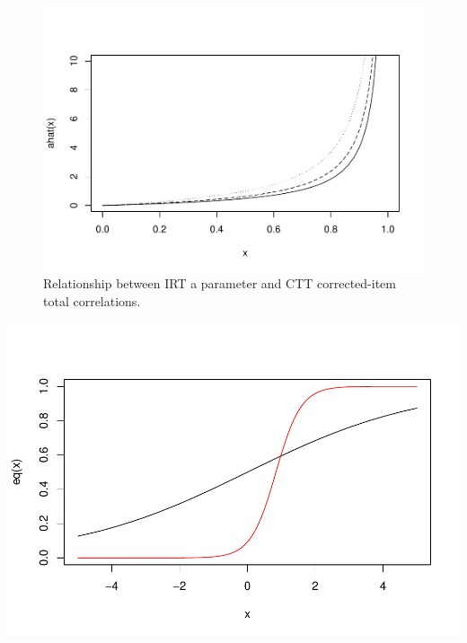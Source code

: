 \documentclass[
  english,
  man]{apa6}
\begin{document}
\begin{figure}
\centering
\includegraphics{ICC_project_files/figure-latex/unnamed-chunk-2-1.pdf}
\caption{\label{fig:unnamed-chunk-2}Relationship between IRT a parameter and CTT corrected-item total correlations.}
\end{figure}

\includegraphics{ICC_project_files/figure-latex/unnamed-chunk-3-1.pdf}
\end{document}
